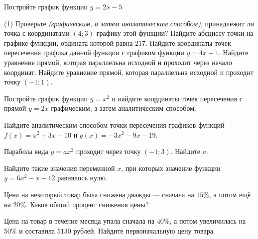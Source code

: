 %
%

\begin{class}[number=1]
	\begin{listofex}
		\item {}
		\item Постройте график функции \( y=2x-5 \)
		\begin{tasks}(1)
			\task Проверьте \textit{(графическим, а затем аналитическим способом)}, принадлежит ли точка с координатами \( (4;3) \) графику этой функции?
			\task Найдите абсциссу точки на графике функции, ордината которой равна \( 217 \).
			\task Найдите координаты точек пересечения графика данной функции с графиком функции \( y=4x-1 \).
			\task Найдите уравнение прямой, которая параллельна исходной и проходит через начало координат.
			\task Найдите уравнение прямой, которая параллельна исходной и проходит точку \( (-1;1) \).
		\end{tasks}
		\item Постройте график функции \(y=x^2\) и найдите координаты точек пересечения с прямой \( y=2x \) графическим, а затем аналитическим способом.
		\item Найдите аналитическим способом точки пересечения графиков функций \(f(x)=x^2+3x-10\)	и \( g(x)=-3x^2-9x-19 \).
		\item Парабола вида \( y=ax^2 \) проходит через точку \( (-1;3) \). Найдите \( a \).
		\item Найдите такие значения переменной \( x \), при которых значение функции \( y=6x^2-x-12 \) равнялось нулю.
		\item Цена на некоторый товар была снижена дважды --- сначала на \( 15\% \), а потом ещё на \( 20\% \). Каков общий процент снижения цены?
		\item Цена на товар в течение месяца упала сначала на \( 40\% \), а потом увеличилась на \( 50\% \) и составила \( 5130  \) рублей. Найдите первоначальную цену товара.
	\end{listofex}
\end{class}

